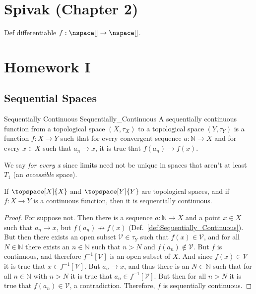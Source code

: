 \section{Spivak (Chapter 2)}
    Def differentiable $f:\nspace[]\rightarrow\nspace[]$.
\section{Homework I}
    \subsection{Sequential Spaces}
        \begin{fdefinition}{Sequentially Continuous}
                           {Sequentially_Continuous}
            A sequentially continuous function from a topological space
            $(X,\tau_{X})$ to a topological space $(Y,\tau_{Y})$ is a
            function $f:X\rightarrow{Y}$ such that for every convergent
            sequence $a:\mathbb{N}\rightarrow{X}$ and for every $x\in{X}$
            such that $a_{n}\rightarrow{x}$, it is true that
            $f(a_{n})\rightarrow{f}(x)$.
        \end{fdefinition}
        We say \textit{for every x} since limits need not be unique in
        spaces that aren't at least $T_{1}$ (an \textit{accessible} space).
        \begin{theorem}
            \label{thm:cont_implies_seq_cont}%
            If $\topspace[X]{X}$ and $\topspace[Y]{Y}$ are topological spaces,
            and if $f:X\rightarrow{Y}$ is a continuous function, then it is
            sequentially continuous.
        \end{theorem}
        \begin{proof}
            For suppose not. Then there is a sequence
            $a:\mathbb{N}\rightarrow{X}$ and a point $x\in{X}$ such that
            $a_{n}\rightarrow{x}$, but $f(a_{n})\not\rightarrow{f}(x)$
            (Def.~\ref{def:Sequentially_Continuous}). But then there exists
            an open subset $\mathcal{V}\in\tau_{Y}$ such that
            $f(x)\in\mathcal{V}$, and for all $N\in\mathbb{N}$ there exists
            an $n\in\mathbb{N}$ such that $n>N$ and
            $f(a_{n})\notin\mathcal{V}$. But $f$ is continuous, and
            therefore $f^{\minus{1}}[\mathcal{V}]$ is an open subset of $X$.
            And since $f(x)\in\mathcal{V}$ it is true that
            $x\in{f}^{\minus{1}}[\mathcal{V}]$. But $a_{n}\rightarrow{x}$,
            and thus there is an $N\in\mathbb{N}$ such that for all
            $n\in\mathbb{N}$ with $n>N$ it is true that
            $a_{n}\in{f}^{\minus{1}}[\mathcal{V}]$. But then for all $n>N$
            it is true that $f(a_{n})\in\mathcal{V}$, a contradiction.
            Therefore, $f$ is sequentially continuous.
        \end{proof}
